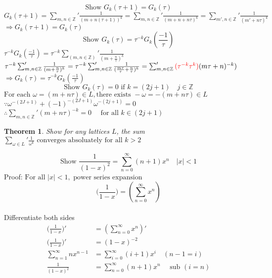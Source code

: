 \documentclass[10pt]{article}
\newtheorem{theorem}{Theorem}
\begin{document}
\noindent
\[\text{Show } G_{k}(\tau + 1) = G_{k}(\tau)\]
$G_{k}(\tau + 1) = \sum_{m, n \in \mathbb{Z}}' \frac{1}{(m+n(\tau+1))^k} = \sum_{m, n \in \mathbb{Z}}' \frac{1}{(m + n + n\tau)^k} = \sum_{m', n \in \mathbb{Z} }' \frac{1}{(m' + n\tau)^k}$\\
$\Rightarrow G_{k}(\tau + 1) = G_{k}(\tau)$\\

\noindent
\[\text{Show } G_{k}(\tau) = \tau^{-k} G_{k}(\frac{-1}{\tau})\]
$\tau^{-k} G_{k}(\frac{-1}{\tau}) =  \tau^{-k} \sum_{(m, n \in \mathbb{Z} )}' \frac{1}{(m+\frac{n}{\tau})^{k}}$\\
$\tau^{-k} \sum_{m, n \in \mathbb{Z}}' \frac{1}{(m + \frac{n}{\tau})^{k}} = \tau^{-k} \sum_{m, n \in \mathbb{Z}}' \frac{1}{(\frac{m\tau}{\tau} + \frac{n}{\tau})^{k}} = \sum_{m, n \in \mathbb{Z}}' \textcolor{red}{(\tau^{-k}\tau^{k})} (m\tau + n)^{-k})$\\
$\Rightarrow G_{k}(\tau) = \tau^{-k} G_{k}(\frac{-1}{\tau})$\\


\noindent
\[\text{Show }G_{k}(\tau) = 0 \text{ if } k = (2j+1) \quad j \in \mathbb{Z} \]
$\text{For each }\omega = (m+n\tau) \in L, \text{there exists } -\omega = -(m+n\tau) \in L $\\
$\because \omega ^{-(2J+1)} + (-1)^{-(2J+1)}\omega^{-(2j+1)} = 0$\\
$\therefore \sum_{m,n \in \mathbb{Z}}' (m+n\tau)^{-k} = 0\quad \text{ for all } k \in (2j+1)$\\

\begin{theorem}
Show for any lattices $L$, the sum $\sum_{\omega \in \mathit{L}}' \frac{1}{\omega^{k}} \text{ converges absoluately for all } k > 2$
\end{theorem}


\pagebreak
\noindent
\[\text{Show }\frac{1}{(1-x)^2} = \sum_{n=0}^{\infty} (n+1)x^n \quad |x| < 1\]
Proof:
$\text{For all } |x| < 1, \text{ power series expansion} $\\
\[(\frac{1}{1-x}\big) = (\sum_{n=0}^{\infty} x^n)\]\\
Differentiate both sides\\
\begin{equation}
\begin{aligned}
(\frac{1}{1-x}\big)' &= (\sum_{n=0}^{\infty} x^n)' \\
(\frac{1}{1-x}\big)' &= (1-x)^{-2}\\ 
\sum_{n=1}^{\infty} nx^{n-1} &= \sum_{i=0}^{\infty} (i+1)x^{i} \quad (n-1=i)\\
\frac{1}{(1-x)^2} &= \sum_{n=0}^{\infty} (n+1)x^{n} \quad \text{ sub }(i = n)\\
\end{aligned}
\end{equation}
\end{document}
